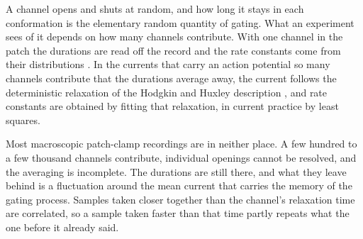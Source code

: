 %
%

A channel opens and shuts at random, and how long it stays in each conformation is the elementary
random quantity of gating. What an experiment sees of it depends on how many channels contribute.
With one channel in the patch the durations are read off the record and the rate constants come from
their distributions \citep{neher1977conductance,colquhoun1981stochastic}. In the currents that carry
an action potential so many channels contribute that the durations average away, the current follows
the deterministic relaxation of the Hodgkin and Huxley description \citep{hodgkin1952quantitative},
and rate constants are obtained by fitting that relaxation, in current practice by least squares.

Most macroscopic patch-clamp recordings are in neither place. A few hundred to a few thousand
channels contribute, individual openings cannot be resolved, and the averaging is incomplete. The
durations are still there, and what they leave behind is a fluctuation around the mean current that
carries the memory of the gating process. Samples taken closer together than the channel's
relaxation time are correlated, so a sample taken faster than that time partly repeats what the one
before it already said.

